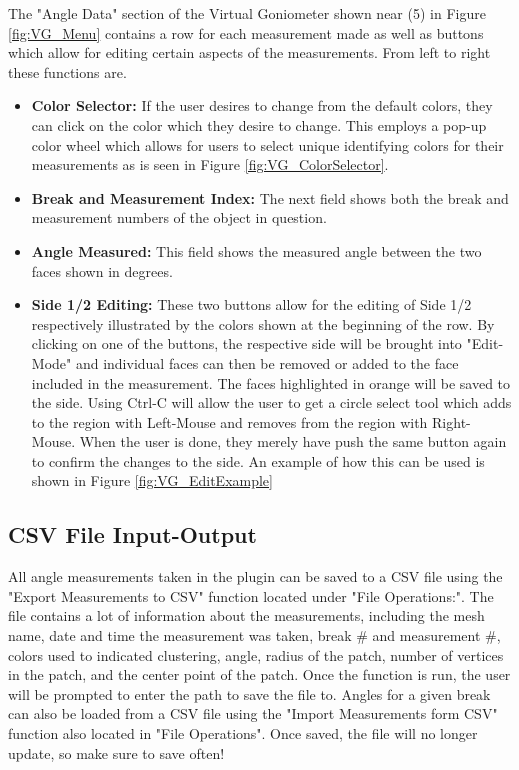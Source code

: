 \documentclass[11pt,leqno]{article}
\theoremstyle{definition}
\begin{document}
The "Angle Data" section of the Virtual Goniometer shown near (5) in Figure \ref{fig:VG_Menu} contains a row for each measurement made as well as buttons which allow for editing certain aspects of the measurements. From left to right these functions are.
\begin{itemize}
\item {\bf Color Selector:} If the user desires to change from the default colors, they can click on the color which they desire to change. This employs a pop-up color wheel which allows for users to select unique identifying colors for their measurements as is seen in Figure \ref{fig:VG_ColorSelector}.
\item {\bf Break and Measurement Index:} The next field shows both the break and measurement numbers of the object in question.
\item {\bf Angle Measured:} This field shows the measured angle between the two faces shown in degrees.
\item {\bf Side 1/2 Editing:} These two buttons allow for the editing of Side 1/2 respectively illustrated by the colors shown at the beginning of the row. By clicking on one of the buttons, the respective side will be brought into "Edit-Mode" and individual faces can then be removed or added to the face included in the measurement. The faces highlighted in orange will be saved to the side. Using Ctrl-C will allow the user to get a circle select tool which adds to the region with Left-Mouse and removes from the region with Right-Mouse. When the user is done, they merely have push the same button again to confirm the changes to the side. An example of how this can be used is shown in Figure \ref{fig:VG_EditExample}
\end{itemize}


\subsection{CSV File Input-Output}

All angle measurements taken in the plugin can be saved to a CSV file using the "Export Measurements to CSV" function located under "File Operations:". The file contains a lot of information about the measurements, including the mesh name, date and time the measurement was taken, break \# and measurement \#, colors used to indicated clustering, angle, radius of the patch, number of vertices in the patch, and the center point of the patch. Once the function is run, the user will be prompted to enter the path to save the file to. Angles for a given break can also be loaded from a CSV file using the "Import Measurements form CSV" function also located in "File Operations". Once saved, the file will no longer update, so make sure to save often!
\end{document}
